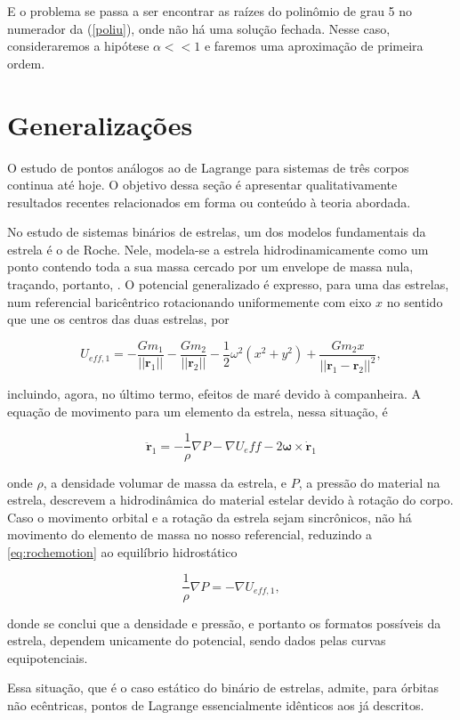 E o problema se passa a ser encontrar as raízes do polinômio de grau 5 no numerador da (\ref{poliu}), onde não há uma solução fechada. Nesse caso, consideraremos a hipótese $\alpha << 1$ e faremos uma aproximação de primeira ordem.

\section{Generalizações}

O estudo de pontos análogos ao de Lagrange para sistemas de três corpos continua até hoje. O objetivo dessa seção é apresentar qualitativamente resultados recentes relacionados em forma ou conteúdo à teoria abordada.

No estudo de sistemas binários de estrelas, um dos modelos fundamentais da estrela é o de Roche. Nele, modela-se a estrela hidrodinamicamente como um ponto contendo toda a sua massa cercado por um envelope de massa nula, traçando, portanto, . O potencial generalizado é expresso, para uma das estrelas, num referencial baricêntrico rotacionando uniformemente com eixo $x$ no sentido que une os centros das duas estrelas, por

\begin{equation}
    U_{eff, 1} = -\frac{Gm_1}{||\mathbf{r}_1||}-\frac{Gm_2}{||\mathbf{r}_2||}-\frac{1}{2}\omega^2(x^2 + y^2)+\frac{Gm_2x}{||\mathbf{r}_1 - \mathbf{r}_2||^2},
\end{equation}

incluindo, agora, no último termo, efeitos de maré devido à companheira. A equação de movimento para um elemento da estrela, nessa situação, é

\begin{equation}
    \label{eq:rochemotion}
    \ddot{\mathbf{r}}_1 = -\frac{1}{\rho}\nabla P - \nabla U_eff - 2\mathbf{\omega}\times\dot{\mathbf{r}}_1
\end{equation}

onde $\rho$, a densidade volumar de massa da estrela, e $P$, a pressão do material na estrela, descrevem a hidrodinâmica do material estelar devido à rotação do corpo. Caso o movimento orbital e a rotação da estrela sejam sincrônicos, não há movimento do elemento de massa no nosso referencial, reduzindo a \ref{eq:rochemotion} ao equilíbrio hidrostático

\begin{equation}
    \frac{1}{\rho}\nabla P = -\nabla U_{eff, 1},
\end{equation}

donde se conclui que a densidade e pressão, e portanto os formatos possíveis da estrela, dependem unicamente do potencial, sendo dados pelas curvas equipotenciais.

Essa situação, que é o caso estático do binário de estrelas, admite, para órbitas não ecêntricas, pontos de Lagrange essencialmente idênticos aos já descritos.

